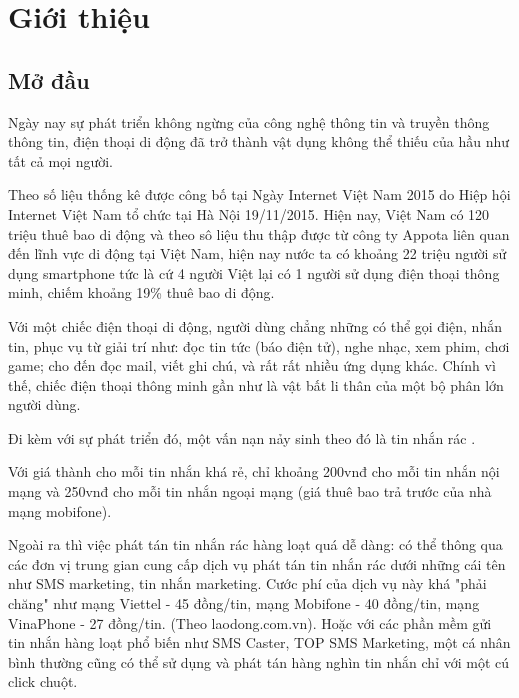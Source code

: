 \chapter{Giới thiệu}
\section{Mở đầu}
Ngày nay sự phát triển không ngừng của công nghệ thông tin và truyền thông thông tin, điện thoại di động đã trở thành vật dụng không thể thiếu của hầu như tất cả mọi người.

Theo số liệu thống kê được công bố tại Ngày Internet Việt Nam 2015 do Hiệp hội Internet Việt Nam tổ chức tại Hà Nội 19/11/2015. Hiện nay, Việt Nam có 120 triệu thuê bao di động và theo sô liệu thu thập được từ công ty Appota liên quan đến lĩnh vực di động tại Việt Nam, hiện nay nước ta có khoảng 22 triệu người sử dụng smartphone tức là cứ 4 người Việt lại có 1 người sử dụng điện thoại thông minh, chiếm khoảng 19\% thuê bao di động.

Với một chiếc điện thoại di động, người dùng chẳng những có thể gọi điện, nhắn tin, phục vụ từ giải trí như: đọc tin tức (báo điện tử), nghe nhạc, xem phim, chơi game; cho đến đọc mail, viết ghi chú, và rất rất nhiều ứng dụng khác. Chính vì thế, chiếc điện thoại thông minh gần như là vật bất li thân của một bộ phân lớn người dùng.
 
Đi kèm với sự phát triển đó, một vấn nạn nảy sinh theo đó là tin nhắn rác \cite{ma2016}.


Với giá thành cho mỗi tin nhắn khá rẻ, chỉ khoảng 200vnđ cho mỗi tin nhắn nội mạng và 250vnđ cho mỗi tin nhắn ngoại mạng (giá thuê bao trả trước của nhà mạng mobifone).

Ngoài ra thì việc phát tán tin nhắn rác hàng loạt quá dễ dàng: có thể thông qua các đơn vị trung gian cung cấp dịch vụ phát tán tin nhắn rác dưới những cái tên như SMS marketing, tin nhắn marketing. Cước phí của dịch vụ này khá "phải chăng" như mạng Viettel - 45 đồng/tin, mạng Mobifone  - 40 đồng/tin, mạng VinaPhone - 27 đồng/tin. (Theo laodong.com.vn). Hoặc với các phần mềm gửi tin nhắn hàng loạt phổ biến như SMS Caster, TOP SMS Marketing, một cá nhân bình thường cũng có thể sử dụng và phát tán hàng nghìn tin nhắn chỉ với một cú click chuột.

